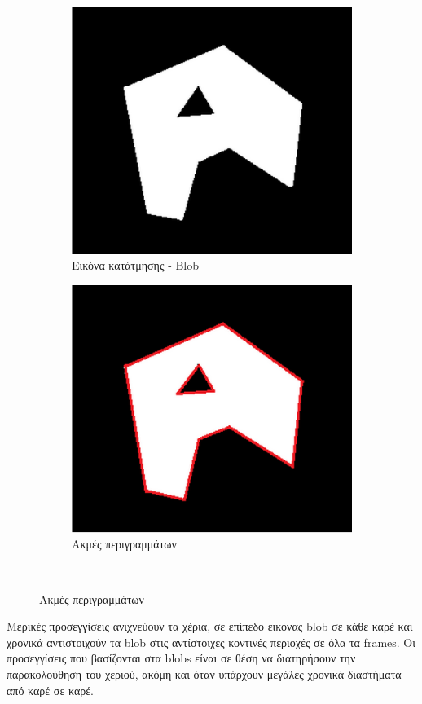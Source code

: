 \begin{figure}[H]
\begin{subfigure}{.5\textwidth}
  \centering
  \includegraphics[width=.7\linewidth]{Files/Figures/blob1.png}
  \caption[Εικόνα κατάτμησης - Blob]{Εικόνα κατάτμησης - Blob}
  \label{fig:sfig1}
\end{subfigure}%
\begin{subfigure}{.5\textwidth}
  \centering
  \includegraphics[width=.7\linewidth]{Files/Figures/blob2.png}
  \caption[Ακμές περιγραμμάτων]{Ακμές περιγραμμάτων}
  \label{fig:sfig2}
\end{subfigure}\\
\label{fig:fig}
\end{figure}





Μερικές προσεγγίσεις ανιχνεύουν τα χέρια, σε επίπεδο εικόνας blob σε κάθε καρέ και χρονικά αντιστοιχούν τα blob στις αντίστοιχες κοντινές περιοχές σε όλα τα frames. Οι προσεγγίσεις που βασίζονται στα blobs είναι σε θέση να διατηρήσουν την παρακολούθηση του χεριού, ακόμη και όταν υπάρχουν μεγάλες χρονικά διαστήματα από καρέ σε καρέ.



